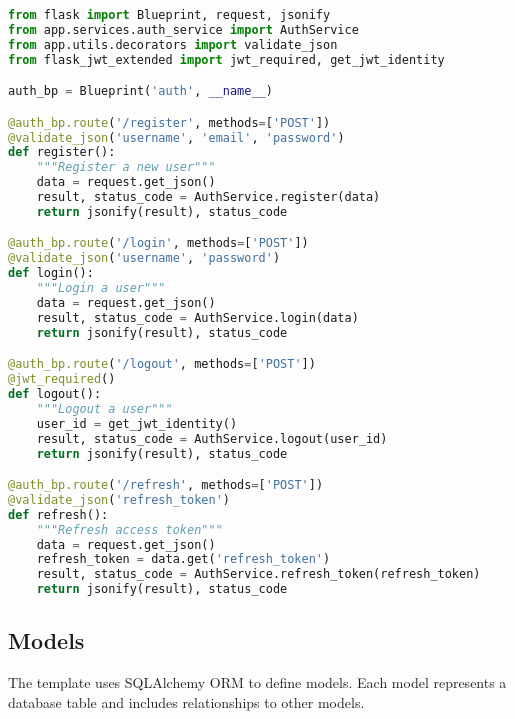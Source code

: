 \documentclass{article}
\begin{document}
\begin{lstlisting}[language=python, caption=Auth Blueprint in app/controllers/auth\_controller.py]
from flask import Blueprint, request, jsonify
from app.services.auth_service import AuthService
from app.utils.decorators import validate_json
from flask_jwt_extended import jwt_required, get_jwt_identity

auth_bp = Blueprint('auth', __name__)

@auth_bp.route('/register', methods=['POST'])
@validate_json('username', 'email', 'password')
def register():
    """Register a new user"""
    data = request.get_json()
    result, status_code = AuthService.register(data)
    return jsonify(result), status_code

@auth_bp.route('/login', methods=['POST'])
@validate_json('username', 'password')
def login():
    """Login a user"""
    data = request.get_json()
    result, status_code = AuthService.login(data)
    return jsonify(result), status_code

@auth_bp.route('/logout', methods=['POST'])
@jwt_required()
def logout():
    """Logout a user"""
    user_id = get_jwt_identity()
    result, status_code = AuthService.logout(user_id)
    return jsonify(result), status_code

@auth_bp.route('/refresh', methods=['POST'])
@validate_json('refresh_token')
def refresh():
    """Refresh access token"""
    data = request.get_json()
    refresh_token = data.get('refresh_token')
    result, status_code = AuthService.refresh_token(refresh_token)
    return jsonify(result), status_code
\end{lstlisting}

\subsection{Models}

The template uses SQLAlchemy ORM to define models. Each model represents a database table and includes relationships to other models.
\end{document}

